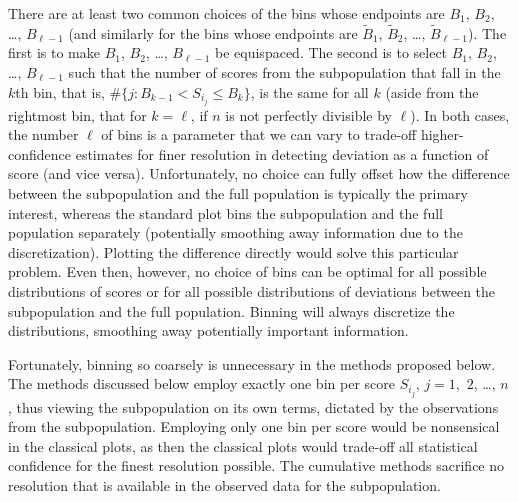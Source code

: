 \documentclass{article}
\begin{document}
There are at least two common choices of the bins
whose endpoints are $B_1$, $B_2$, \dots, $B_{\ell-1}$
(and similarly for the bins whose endpoints are
$\tilde{B}_1$, $\tilde{B}_2$, \dots, $\tilde{B}_{\ell-1}$).
The first is to make $B_1$, $B_2$, \dots, $B_{\ell-1}$ be equispaced.
The second is to select $B_1$, $B_2$, \dots, $B_{\ell-1}$ such that
the number of scores from the subpopulation that fall in the $k$th bin,
that is, $\#\{j : B_{k-1} < S_{i_j} \le B_k\}$, is the same for all $k$
(aside from the rightmost bin, that for $k = \ell$,
if $n$ is not perfectly divisible by $\ell$).
In both cases, the number $\ell$ of bins is a parameter that we can vary
to trade-off higher-confidence estimates for finer resolution
in detecting deviation as a function of score (and vice versa).
Unfortunately, no choice can fully offset how the difference between
the subpopulation and the full population is typically the primary interest,
whereas the standard plot bins the subpopulation and the full population
separately (potentially smoothing away information due to the discretization).
Plotting the difference directly would solve this particular problem.
Even then, however, no choice of bins can be optimal
for all possible distributions of scores or for all possible distributions
of deviations between the subpopulation and the full population.
Binning will always discretize the distributions,
smoothing away potentially important information.

Fortunately, binning so coarsely is unnecessary in the methods proposed below.
The methods discussed below employ exactly one bin per score $S_{i_j}$,
$j = 1$,~$2$, \dots, $n$, thus viewing the subpopulation on its own terms,
dictated by the observations from the subpopulation.
Employing only one bin per score would be nonsensical in the classical plots,
as then the classical plots would trade-off all statistical confidence
for the finest resolution possible.
The cumulative methods sacrifice no resolution that is available
in the observed data for the subpopulation.
\end{document}
